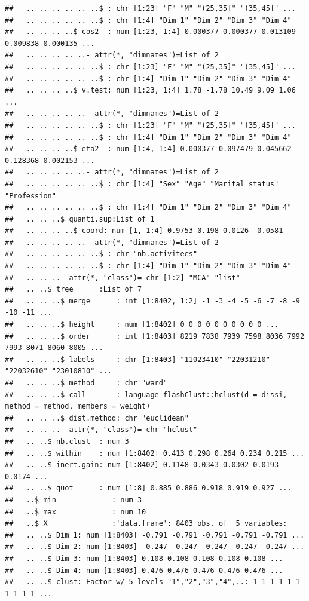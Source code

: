 \documentclass[]{book}
\begin{document}
\begin{verbatim}
##   .. .. .. .. .. ..$ : chr [1:23] "F" "M" "(25,35]" "(35,45]" ...
##   .. .. .. .. .. ..$ : chr [1:4] "Dim 1" "Dim 2" "Dim 3" "Dim 4"
##   .. .. .. ..$ cos2  : num [1:23, 1:4] 0.000377 0.000377 0.013109 0.009838 0.000135 ...
##   .. .. .. .. ..- attr(*, "dimnames")=List of 2
##   .. .. .. .. .. ..$ : chr [1:23] "F" "M" "(25,35]" "(35,45]" ...
##   .. .. .. .. .. ..$ : chr [1:4] "Dim 1" "Dim 2" "Dim 3" "Dim 4"
##   .. .. .. ..$ v.test: num [1:23, 1:4] 1.78 -1.78 10.49 9.09 1.06 ...
##   .. .. .. .. ..- attr(*, "dimnames")=List of 2
##   .. .. .. .. .. ..$ : chr [1:23] "F" "M" "(25,35]" "(35,45]" ...
##   .. .. .. .. .. ..$ : chr [1:4] "Dim 1" "Dim 2" "Dim 3" "Dim 4"
##   .. .. .. ..$ eta2  : num [1:4, 1:4] 0.000377 0.097479 0.045662 0.128368 0.002153 ...
##   .. .. .. .. ..- attr(*, "dimnames")=List of 2
##   .. .. .. .. .. ..$ : chr [1:4] "Sex" "Age" "Marital status" "Profession"
##   .. .. .. .. .. ..$ : chr [1:4] "Dim 1" "Dim 2" "Dim 3" "Dim 4"
##   .. .. ..$ quanti.sup:List of 1
##   .. .. .. ..$ coord: num [1, 1:4] 0.9753 0.198 0.0126 -0.0581
##   .. .. .. .. ..- attr(*, "dimnames")=List of 2
##   .. .. .. .. .. ..$ : chr "nb.activitees"
##   .. .. .. .. .. ..$ : chr [1:4] "Dim 1" "Dim 2" "Dim 3" "Dim 4"
##   .. .. ..- attr(*, "class")= chr [1:2] "MCA" "list"
##   .. ..$ tree      :List of 7
##   .. .. ..$ merge      : int [1:8402, 1:2] -1 -3 -4 -5 -6 -7 -8 -9 -10 -11 ...
##   .. .. ..$ height     : num [1:8402] 0 0 0 0 0 0 0 0 0 0 ...
##   .. .. ..$ order      : int [1:8403] 8219 7838 7939 7598 8036 7992 7993 8071 8060 8005 ...
##   .. .. ..$ labels     : chr [1:8403] "11023410" "22031210" "22032610" "23010810" ...
##   .. .. ..$ method     : chr "ward"
##   .. .. ..$ call       : language flashClust::hclust(d = dissi, method = method, members = weight)
##   .. .. ..$ dist.method: chr "euclidean"
##   .. .. ..- attr(*, "class")= chr "hclust"
##   .. ..$ nb.clust  : num 3
##   .. ..$ within    : num [1:8402] 0.413 0.298 0.264 0.234 0.215 ...
##   .. ..$ inert.gain: num [1:8402] 0.1148 0.0343 0.0302 0.0193 0.0174 ...
##   .. ..$ quot      : num [1:8] 0.885 0.886 0.918 0.919 0.927 ...
##   ..$ min             : num 3
##   ..$ max             : num 10
##   ..$ X               :'data.frame': 8403 obs. of  5 variables:
##   .. ..$ Dim 1: num [1:8403] -0.791 -0.791 -0.791 -0.791 -0.791 ...
##   .. ..$ Dim 2: num [1:8403] -0.247 -0.247 -0.247 -0.247 -0.247 ...
##   .. ..$ Dim 3: num [1:8403] 0.108 0.108 0.108 0.108 0.108 ...
##   .. ..$ Dim 4: num [1:8403] 0.476 0.476 0.476 0.476 0.476 ...
##   .. ..$ clust: Factor w/ 5 levels "1","2","3","4",..: 1 1 1 1 1 1 1 1 1 1 ...

\end{verbatim}
\end{document}
